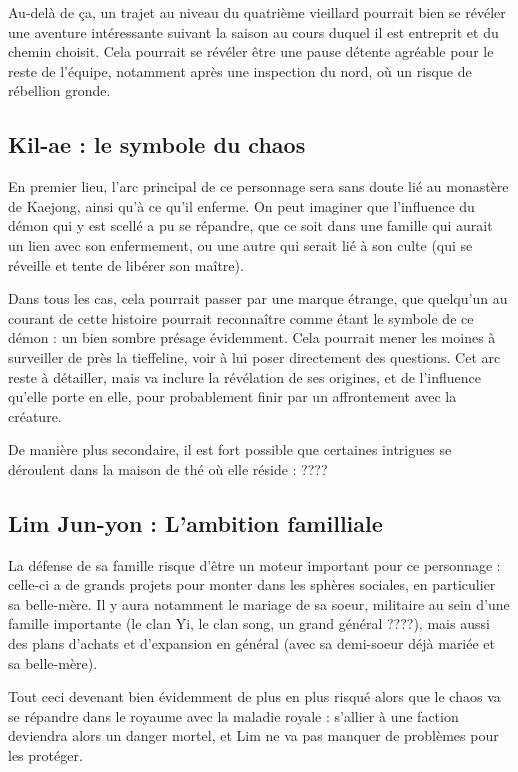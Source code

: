 \documentclass[10pt,a4paper]{book}
\begin{document}
Au-delà de ça, un trajet au niveau du quatrième vieillard pourrait bien se révéler une aventure intéressante suivant la saison au cours duquel il est entreprit et du chemin choisit. Cela pourrait se révéler être une pause détente agréable pour le reste de l'équipe, notamment après une inspection du nord, où un risque de rébellion gronde.


\subsection{Kil-ae : le symbole du chaos}
En premier lieu, l'arc principal de ce personnage sera sans doute lié au monastère de Kaejong, ainsi qu'à ce qu'il enferme. On peut imaginer que l'influence du démon qui y est scellé a pu se répandre, que ce soit dans une famille qui aurait un lien avec son enfermement, ou une autre qui serait lié à son culte (qui se réveille et tente de libérer son maître).

Dans tous les cas, cela pourrait passer par une marque étrange, que quelqu'un au courant de cette histoire pourrait reconnaître comme étant le symbole de ce démon : un bien sombre présage évidemment. Cela pourrait mener les moines à surveiller de près la tieffeline, voir à lui poser directement des questions. Cet arc reste à détailler, mais va inclure la révélation de ses origines, et de l'influence qu'elle porte en elle, pour probablement finir par un affrontement avec la créature.

De manière plus secondaire, il est fort possible que certaines intrigues se déroulent dans la maison de thé où elle réside : ????
\subsection{Lim Jun-yon : L'ambition familliale}
La défense de sa famille risque d'être un moteur important pour ce personnage : celle-ci a de grands projets pour monter dans les sphères sociales, en particulier sa belle-mère. Il y aura notamment le mariage de sa soeur, militaire au sein d'une famille importante (le clan Yi, le clan song, un grand général ????), mais aussi des plans d'achats et d'expansion en général (avec sa demi-soeur déjà mariée et sa belle-mère). 

Tout ceci devenant bien évidemment de plus en plus risqué alors que le chaos va se répandre dans le royaume avec la maladie royale : s'allier à une faction deviendra alors un danger mortel, et Lim ne va pas manquer de problèmes pour les protéger.
\end{document}
